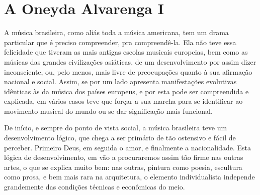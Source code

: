 


\section*{A Oneyda Alvarenga I}

A música brasileira, como aliás toda a música americana, tem um drama
particular que é preciso compreender, pra compreendê-la. Ela não teve
essa felicidade que tiveram as mais antigas escolas musicais europeias,
bem como as músicas das grandes civilizações asiáticas, de um
desenvolvimento por assim dizer inconsciente, ou, pelo menos, mais livre
de preocupações quanto à sua afirmação nacional e social. Assim, se por
um lado apresenta manifestações evolutivas idênticas às da música dos
países europeus, e por esta pode ser compreendida e explicada, em vários
casos teve que forçar a sua marcha para se identificar ao movimento
musical do mundo ou se dar significação mais funcional.

De início, e sempre do ponto de vista social, a música brasileira teve
um desenvolvimento lógico, que chega a ser primário de tão ostensivo e
fácil de perceber. Primeiro Deus, em seguida o amor, e finalmente a
nacionalidade. Esta lógica de desenvolvimento, em vão a procuraremos
assim tão firme nas outras artes, o que se explica muito bem: nas
outras, pintura como poesia, escultura como prosa, e bem mais rara na
arquitetura, o elemento individualista independe grandemente das
condições técnicas e econômicas do meio.

